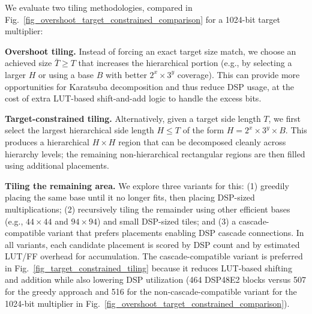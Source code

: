 \documentclass[sigconf,9pt,review]{acmart}
\begin{document}
We evaluate two tiling methodologies, compared in Fig.~\ref{fig_overshoot_target_constrained_comparison} for a 1024-bit target multiplier:

\noindent\textbf{Overshoot tiling.}
Instead of forcing an exact target size match, we choose an achieved size $\bar{T}\ge T$ that increases the hierarchical portion (e.g., by selecting a larger $H$ or using a base $B$ with better $2^x\times3^y$ coverage).
This can provide more opportunities for Karatsuba decomposition and thus reduce DSP usage, at the cost of extra LUT-based shift-and-add logic to handle the excess bits.

\noindent\textbf{Target-constrained tiling.}
Alternatively, given a target side length $T$, we first select the largest hierarchical side length $H \le T$ of the form $H=2^x\times3^y\times B$.
This produces a hierarchical $H\times H$ region that can be decomposed cleanly across hierarchy levels; the remaining non-hierarchical rectangular regions are then filled using additional placements.

\noindent\textbf{Tiling the remaining area.}
We explore three variants for this:
(1) greedily placing the same base until it no longer fits, then placing DSP-sized multiplications;
(2) recursively tiling the remainder using other efficient bases (e.g., $44\times44$ and $94\times94$) and small DSP-sized tiles; and
(3) a cascade-compatible variant that prefers placements enabling DSP cascade connections.
In all variants, each candidate placement is scored by DSP count and by estimated LUT/FF overhead for accumulation.
The cascade-compatible variant is preferred in Fig.~\ref{fig_target_constrained_tiling} because it reduces LUT-based shifting and addition while also lowering DSP utilization (464 DSP48E2 blocks versus 507 for the greedy approach and 516 for the non-cascade-compatible variant for the 1024-bit multiplier in Fig.~\ref{fig_overshoot_target_constrained_comparison}).
\end{document}
